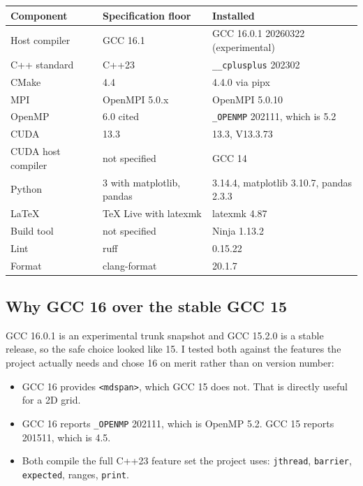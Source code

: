 \documentclass[11pt,a4paper]{report}
\begin{document}
\begin{center}
\begin{longtable}{lll}
\toprule
Component & Specification floor & Installed \\
\midrule
\endhead
Host compiler & GCC 16.1 & GCC 16.0.1 20260322 (experimental) \\
C++ standard & C++23 & \texttt{\_\_cplusplus} 202302 \\
CMake & 4.4 & 4.4.0 via pipx \\
MPI & OpenMPI 5.0.x & OpenMPI 5.0.10 \\
OpenMP & 6.0 cited & \texttt{\_OPENMP} 202111, which is 5.2 \\
CUDA & 13.3 & 13.3, V13.3.73 \\
CUDA host compiler & not specified & GCC 14 \\
Python & 3 with matplotlib, pandas & 3.14.4, matplotlib 3.10.7, pandas 2.3.3 \\
LaTeX & TeX Live with latexmk & latexmk 4.87 \\
Build tool & not specified & Ninja 1.13.2 \\
Lint & ruff & 0.15.22 \\
Format & clang-format & 20.1.7 \\
\bottomrule
\end{longtable}
\end{center}

\subsection{Why GCC 16 over the stable GCC 15}

GCC 16.0.1 is an experimental trunk snapshot and GCC 15.2.0 is a stable release,
so the safe choice looked like 15. I tested both against the features the project
actually needs and chose 16 on merit rather than on version number:

\begin{itemize}[leftmargin=*]
  \item GCC 16 provides \texttt{<mdspan>}, which GCC 15 does not. That is
        directly useful for a 2D grid.
  \item GCC 16 reports \texttt{\_OPENMP} 202111, which is OpenMP 5.2. GCC 15
        reports 201511, which is 4.5.
  \item Both compile the full C++23 feature set the project uses:
        \texttt{jthread}, \texttt{barrier}, \texttt{expected}, ranges,
        \texttt{print}.
\end{itemize}
\end{document}
